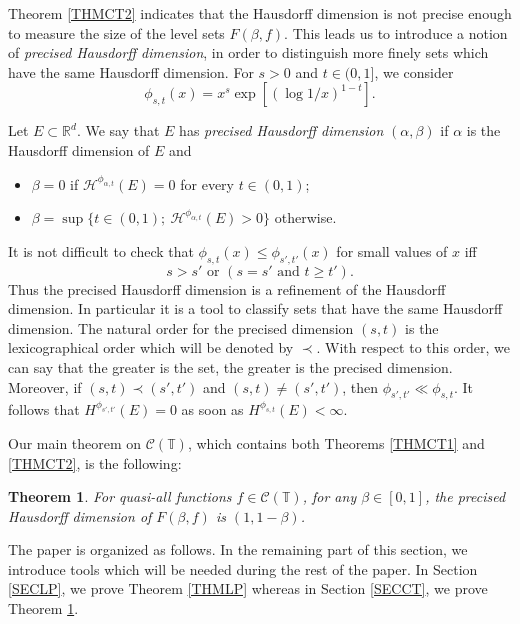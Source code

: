 \documentclass[11pt,a4paper]{amsart}
\theoremstyle{plain}
\newtheorem{theorem}{Theorem}[section]
\begin{document}
Theorem \ref{THMCT2} indicates that the Hausdorff dimension is not precise enough to measure the size of the level sets $F(\beta,f)$.
This leads us to introduce a notion of \emph{precised Hausdorff dimension}, in
order to distinguish more finely sets which have the same
Hausdorff dimension. For $s> 0$ and $t\in(0,1]$, we consider 
$$\phi_{s,t}(x)=x^s \exp\left[(\log 1/x)^{1-t}\right].$$

\begin{definition}
Let $E\subset\mathbb R^d$. We say that $E$ has \emph{precised Hausdorff
  dimension} $(\alpha,\beta)$ if $\alpha$ is the Hausdorff dimension of $E$ and  
\begin{itemize}
\item $\beta=0$ if $\mathcal H^{\phi_{\alpha,t}}(E)=0$ for every $t\in(0,1)$;
\item $\beta=\sup\big\{t\in(0,1);\ \mathcal H^{\phi_{\alpha,t}}(E)>0\big\}$ otherwise.
\end{itemize}
\end{definition}
It is not difficult to check that $\phi_{s,t}(x)\leq\phi_{s',t'}(x)$ for small values of $x$ iff
$$s>s'\textrm{ or }(s=s'\textrm{ and }t\geq t').$$
Thus the precised Hausdorff dimension is a refinement of the Hausdorff
dimension. In particular it is a tool to classify sets that have the same
Hausdorff dimension. The natural order for the precised dimension $(s,t)$ is
the lexicographical order which will be denoted by $\prec$. 
With respect to this order, we can say that the
greater is the set, the greater is the precised dimension. Moreover, if
$(s,t)\prec (s',t')$ and $(s,t)\not= (s',t')$, then  $\phi_{s',t'}\ll
\phi_{s,t}$. It follows that 
$H^{\phi_{s',t'}}(E)=0$ as soon as $H^{\phi_{s,t}}(E)<\infty$.

\smallskip

Our main theorem on $\mathcal C(\mathbb T)$, which contains both Theorems \ref{THMCT1} and \ref{THMCT2}, is the following:
\begin{theorem}\label{THMCT3}
For quasi-all functions $f\in\mathcal C(\mathbb T)$, for any $\beta\in[0,1]$, the precised Hausdorff dimension of $F(\beta,f)$ is $(1,1-\beta)$.
\end{theorem}
\medskip

The paper is organized as follows. In the remaining part of this section, we introduce tools which will be needed during the rest of the paper.
In Section \ref{SECLP}, we prove Theorem \ref{THMLP} whereas in Section \ref{SECCT}, we prove Theorem \ref{THMCT3}. 
\end{document}
